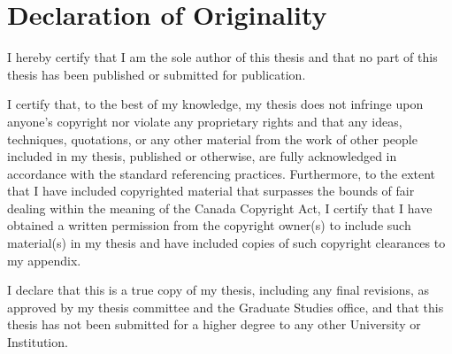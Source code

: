 \newpage
\pagestyle{plain}
\chapter*{Declaration of Originality} %
I hereby certify that I am the sole author of this thesis and that no part of this thesis has been published or submitted for publication. \par I certify that, to the best of my knowledge, my thesis does not infringe upon anyone’s copyright nor violate any proprietary rights and that any ideas, techniques, quotations, or any other material from the work of other people included in my thesis, published or otherwise, are fully acknowledged in accordance with the standard referencing practices. Furthermore, to the extent that I have included copyrighted material that surpasses the bounds of fair dealing within the meaning of the Canada Copyright Act, I certify that I have obtained a written permission from the copyright owner(s) to include such material(s) in my thesis and have included copies of such copyright clearances to my appendix. \par I declare that this is a true copy of my thesis, including any final revisions, as approved by my thesis committee and the Graduate Studies office, and that this thesis has not been submitted for a higher degree to any other University or Institution. 
